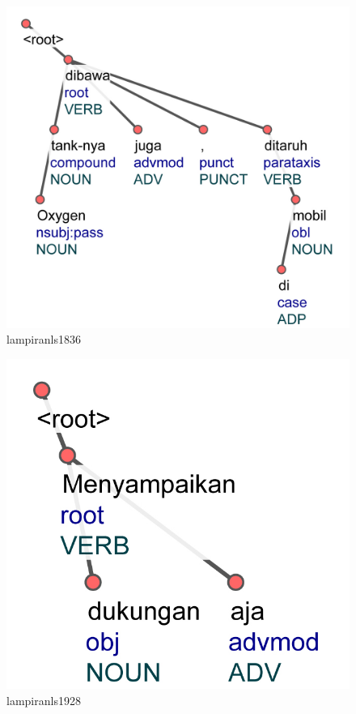 \begin{figure}
	\centering \includegraphics[width=0.8
	\textwidth] {pics/lampiran/lampiranls1836.jpg} 
	\caption{lampiranls1836} 
	\label{fig:lampiranls1836} 
\end{figure}

\begin{figure}
	\centering \includegraphics[width=0.8
	\textwidth] {pics/lampiran/lampiranls1928.jpg} 
	\caption{lampiranls1928} 
	\label{fig:lampiranls1928} 
\end{figure}


